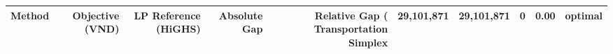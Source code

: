 \begin{tabular}{lrrrrr}
\toprule
Method & Objective (VND) & LP Reference (HiGHS) & Absolute Gap & Relative Gap (%
\midrule
Transportation Simplex & 29,101,871 & 29,101,871 & 0 & 0.00 & optimal \\
\bottomrule
\end{tabular}
